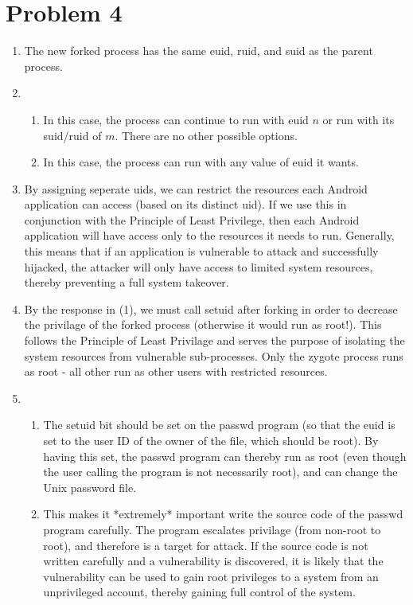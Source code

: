 \documentclass[12pt]{article}
\begin{document}
\section*{Problem 4}
\begin{enumerate}[label=(\alph*)]
	\item The new forked process has the same euid, ruid, and suid as the parent process.
	\item
		\begin{enumerate}[label=(\alph*)]
			\item In this case, the process can continue to run with euid $n$ or run with its suid/ruid of $m$. There are no other possible options.
			\item In this case, the process can run with any value of euid it wants.
		\end{enumerate}
	\item By assigning seperate uids, we can restrict the resources each Android application can access (based on its distinct uid). If we use this in conjunction with the Principle of Least Privilege, then each Android application will have access only to the resources it needs to run. Generally, this means that if an application is vulnerable to attack and successfully hijacked, the attacker will only have access to limited system resources, thereby preventing a full system takeover.
	\item By the response in (1), we must call setuid after forking in order to decrease the privilage of the forked process (otherwise it would run as root!). This follows the Principle of Least Privilage and serves the purpose of isolating the system resources from vulnerable sub-processes. Only the zygote process runs as root - all other run as other users with restricted resources.
	\item
	\begin{enumerate}[label=(\alph*)]
		\item The setuid bit should be set on the passwd program (so that the euid is set to the user ID of the owner of the file, which should be root). By having this set, the passwd program can thereby run as root (even though the user calling the program is not necessarily root), and can change the Unix password file.
		\item This makes it *extremely* important write the source code of the passwd program carefully. The program escalates privilage (from non-root to root), and therefore is a target for attack. If the source code is not written carefully and a vulnerability is discovered, it is likely that the vulnerability can be used to gain root privileges to a system from an unprivileged account, thereby gaining full control of the system.
	\end{enumerate}
\end{enumerate}
\end{document}
